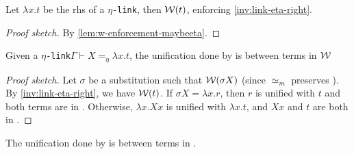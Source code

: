 \documentclass[sigconf,natbib=false,review]{acmart}
\newcommand{\appsep}{\ensuremath{\textcolor{lightgray}{\cdot}}}
\newcommand{\UnifRel}{\ensuremath{\simeq}}
\newcommand{\Ue}{\ensuremath{\UnifRel_m}\xspace}
\newcommand{\linkMacro}[1]{\ensuremath{#1}\texttt{-link}\xspace}
\newcommand{\linketa} {\linkMacro{\eta}}
\newcommand{\linketaM}[3]{\ensuremath{#1 \vdash #2 =_\eta #3}}
\newcommand{\rhs}{rhs\xspace}
\begin{document}
\begin{lemma}
  Let $\lambda x.t$ be the \rhs of a \linketa, then $\mathcal{W}(t)$, enforcing \cref{inv:link-eta-right}.
  \label{lemma:unif-eta-aux}
\end{lemma}

\begin{proof}[Proof sketch]
  By \cref{lem:w-enforcement-maybeeta}.
\end{proof}

\begin{lemma}
  Given a \linketa \linketaM{\Gamma}{X}{\lambda x.t}, the unification done by \progressetaleft is between
  terms in $\mathcal{W}$  
  \label{lemma:unif-eta-1}
\end{lemma}

\begin{proof}[Proof sketch]
  Let $\sigma$ be a substitution such that $\mathcal{W}(\sigma X)$ (since \Ue preserves \wellb).
  By \cref{inv:link-eta-right}, we have $\mathcal{W}(t)$.
  If $\sigma X = \lambda x.r$, then $r$ is unified with $t$ and both terms are in \wellb.
  Otherwise, $\lambda x. X x$ is unified with $\lambda x. t$, and $X x$ and $t$
  are both in \wellb.
\end{proof}



\begin{lemma}
  The unification done by \progressetadedup is between
  terms in \wellb.
  \label{lemma:unif-eta-3}
\end{lemma}
\end{document}
